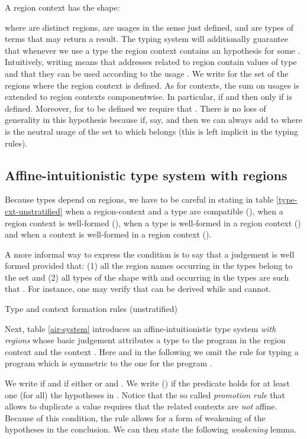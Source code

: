 \documentclass[11pt]{article}
\begin{document}
A region context  has the shape:

where  are distinct regions,  are usages in the sense just defined, 
and  are types of terms that may return a result. 
The typing system will additionally guarantee that whenever we use a type 
 the region context  contains 
an hypothesis  for some .
Intuitively, writing  means that addresses related to region
 contain values of type  and that they 
can be used according to the usage .
We  write  for the set  of the regions
where the region context is defined.
As for contexts, the sum on usages is extended to region contexts
componentwise.
In particular,  if  and  then
 only if 
 is defined. 
Moreover, for  to be defined we require that .
There is no loss of generality in this hypothesis because if, say, 
 and  then we can always add 
 to  where  is the neutral usage of the set to which
 belongs (this is left implicit in the typing rules).


\subsection{Affine-intuitionistic type system with regions}
Because types depend on regions, we have to be careful in stating in 
table \ref{type-cxt-unstratified}
when a region-context and a type are compatible (),
when a region context is well-formed (), 
when a type is well-formed in a region context () 
and when a context is well-formed in a region context ().

A more informal way to express the condition is to say that a
judgement  is well formed provided that: (1) all the region names
occurring in the types  belong to the set
 and (2) all types of the shape
 with  and occurring in the
types  are such that .
For instance, one may verify that  can be derived while
 and
 cannot.



\begin{table}
{\footnotesize
}
\caption{Type and context formation rules (unstratified)}\label{type-cxt-unstratified}
\end{table}
Next, table \ref{air-system} introduces an affine-intuitionistic type system 
{\em with regions} whose basic judgement
 attributes a type  to the program 
in the region context  and the context .
Here and in the following we omit the rule for typing a program
 which is symmetric to the one for the program .


We write  if  and
 if either  or
 and . We write  ()
if the predicate  holds for at least one (for all) the hypotheses in
. Notice that the so called {\em promotion rule} that allows to
duplicate a value requires that the related contexts are {\em not}
affine.  Because of this condition, the rule allows for a form of
weakening of the hypotheses in the conclusion.  We can then state the
following {\em weakening} lemma.
\end{document}
